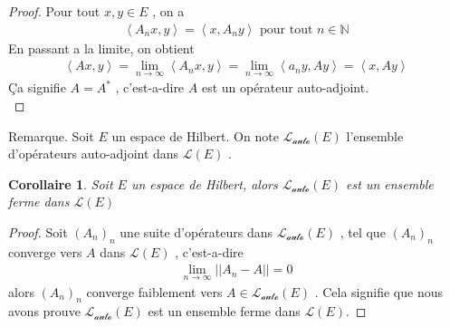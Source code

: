 \documentclass{report}
\newtheorem{Cor}{Corollaire}[subsection]
\begin{document}
{\begin{proof}
Pour tout $x, y \in E$ , on a 
					\begin{align*}
					 \left< A_nx,y \right> = \left< x,A_ny \right> \,\,\text{pour tout}\,\, n \in \mathbb{N} 
					\end{align*}
En passant a la limite, on obtient 
					\begin{align*}
					 \left< Ax,y \right> = \lim_{n\rightarrow \infty} \left< A_nx,y \right> = \lim_{n\rightarrow \infty} \left< a_ny,Ay \right> = \left< x,Ay \right>
					\end{align*}
Ça signifie $A = A^*$ , c'est-a-dire $A$ est un opérateur auto-adjoint. \\
\end{proof}


Remarque. Soit $E$ un espace de Hilbert. On note $\mathscr{L_{auto}}(E)$ l'ensemble d'opérateurs auto-adjoint dans $\mathscr{L}(E)$ .\\

\begin{Cor} Soit $E$ un espace de Hilbert, alors $\mathscr{L_{auto}}(E)$ est un ensemble ferme dans $\mathscr{L}(E)$ \\
\end{Cor}
\begin{proof}
Soit $(A_n)_n$ une suite d'opérateurs dans $\mathscr{L_{auto}}(E)$ , tel que $(A_n)_n$ converge vers $A$ dans $\mathscr{L}(E)$ , c'est-a-dire 
					\begin{align*}
					 \lim_{n\rightarrow \infty} ||A_n - A|| = 0
					\end{align*}
alors $(A_n)_n$ converge faiblement vers $A \in \mathscr{L_{auto}}(E)$ . Cela signifie que nous avons prouve $\mathscr{L_{auto}}(E)$ est un ensemble ferme dans $\mathscr{L}(E)$.
\end{proof}


}
\end{document}
